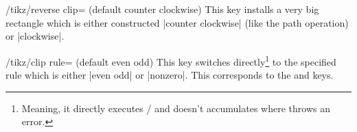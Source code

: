 \pagebreak
\section{\tikzname}
\begin{multicols}{2}
\begin{key}{/tikz/reverse clip= (default counter clockwise)}
This key installs a very big rectangle which is either constructed
|counter clockwise| (like the 
path operation) or |clockwise|.
\end{key}
\begin{key}{/tikz/clip rule= (default even odd)}
This key switches directly\footnote{%
  Meaning, it directly executes
  /%
  and doesn't accumulates where \tikzname\space
  throws an error.}
to the specified rule which is
either |even odd| or |nonzero|.
This corresponds to the  and
 keys.
\end{key}
\end{multicols}
\begin{codeexample}[preamble=\usetikzlibrary{ext.misc},width=6cm]
\newcommand*\myDiagram[1]{
  \fill[left color=blue, right color=green] (0, 0) rectangle (2, 1);
  \clip (1, .5) #1 [reverse clip];
  \fill[left color=green, right color=blue] (0, 0) rectangle (2, 1);
}
\end{codeexample}
\endinput